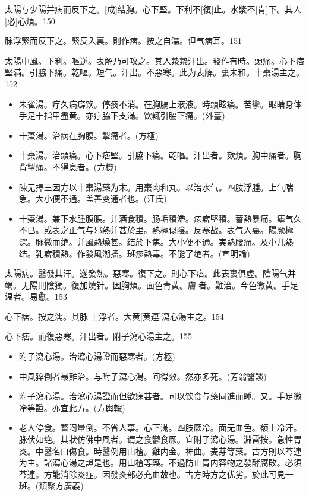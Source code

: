\documentclass[oneside,b4paper]{ctexbook}
\begin{document}
\begin{flushleft}
太陽与少陽并病而反下之。[成]结胸。心下堅。下利不[復]止。水漿不[肯]下。其人[必]心煩。150

脉浮緊而反下之。緊反入裏。則作痞。按之自濡。但气痞耳。151

太陽中風。下利。嘔逆。表解乃可攻之。其人漐漐汗出。發作有時。頭痛。心下痞堅滿。引脇下痛。乾嘔。短气。汗出。不惡寒。此为表解。裏未和。十棗湯主之。152

\begin{itemize}
\item 朱雀湯。疗久病癖饮。停痰不消。在胸膈上液液。時頭眩痛。苦攣。眼睛身体手足十指甲盡黄。亦疗脇下支滿。饮輒引脇下痛。(外臺)
\item 十棗湯。治病在胸腹。掣痛者。(方極)
\item 十棗湯。治頭痛。心下痞堅。引脇下痛。乾嘔。汗出者。欬煩。胸中痛者。胸背掣痛。不得息者。(方機)
\item 陳无擇三因方以十棗湯藥为末。用棗肉和丸。以治水气。四肢浮腫。上气喘急。大小便不通。盖善变通者也。(汪氏)
\item 十棗湯。兼下水腫腹脹。并酒食積。肠垢積滯。痃癖堅積。蓄熱暴痛。瘧气久不已。或表之正气与邪熱并甚於里。熱極似陰。反寒战。表气入裏。陽厥極深。脉微而绝。并風熱燥甚。结於下焦。大小便不通。実熱腰痛。及小儿熱结。乳癖積熱。作發風潮搐。斑疹熱毒。不能了绝者。(宣明論)
\end{itemize}

太陽病。醫發其汗。遂發熱。惡寒。復下之。則心下痞。此表裏俱虛。陰陽气并竭。无陽則陰獨。復加燒针。因胸煩。面色青黄。膚{𥆧}者。難治。今色微黄。手足温者。易愈。153

心下痞。按之濡。其脉{𬮦}上浮者。大黄[黄連]瀉心湯主之。154

心下痞。而復惡寒。汗出者。附子瀉心湯主之。155

\begin{itemize}
\item 附子瀉心湯。治瀉心湯證而惡寒者。(方極)
\item 中風猝倒者最難治。与附子瀉心湯。间得效。然亦多死。(芳翁醫談)
\item 附子瀉心湯。治瀉心湯證而但欲寐甚者。可以饮食与藥同進而睡。又。手足微冷等證。亦宜此方。(方輿輗)
\item 老人停食。瞀闷暈倒。不省人事。心下滿。四肢厥冷。面无血色。额上冷汗。脉伏如绝。其狀仿佛中風者。谓之食鬱食厥。宜附子瀉心湯。淵雷按。急性胃炎。中醫名曰傷食。時醫例用山楂。雞内金。神曲。麦芽等藥。古方則以芩連为主。諸瀉心湯之證是也。用山楂等藥。不過防止胃内容物之發酵腐敗。必須芩連。方能消除炎症。因發炎部必充血故也。古方時方之优劣。於此可見一斑。(類聚方廣義)
\end{itemize}


\end{flushleft}
\end{document}
